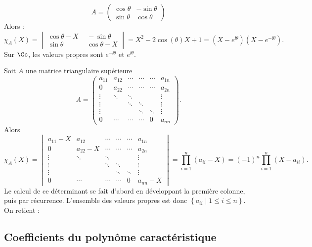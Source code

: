 \documentclass[11pt, class=report,crop=false]{standalone}
\begin{document}
\begin{exemple}
$$A = \begin{pmatrix}
\cos \theta & -\sin \theta\\
\sin \theta &\cos \theta
\end{pmatrix}$$
Alors :
\[\chi_A(X) 
= \begin{vmatrix}
\cos \theta -X \  & \ -\sin \theta\\
\sin \theta \  & \ \cos \theta-X
\end{vmatrix}
= X^2-2\cos(\theta) X +1 
= (X-e^{\ii\theta}) (X-e^{-\ii\theta}).\]
Sur $\Cc$, les valeurs propres sont $e^{-\ii\theta}$ et $e^{\ii\theta}$.
\end{exemple}


\begin{exemple}
Soit $A$ une matrice triangulaire supérieure
$$A = 
\begin{pmatrix}
a_{11} & a_{12} &\cdots&\cdots&\cdots & a_{1n}\\
0&a_{22}&\cdots&\cdots&\cdots&a_{2n}\\
\vdots&\ddots&\ddots&&&\vdots\\
\vdots&&\ddots&\ddots&&\vdots\\
\vdots & &&\ddots&\ddots&\vdots\\
0&\cdots&\cdots&\cdots&0&a_{nn}
\end{pmatrix}.
$$
Alors 
$$\chi_A(X)
= \begin{vmatrix}
a_{11}-X & a_{12} &\cdots&\cdots&\cdots & a_{1n}\\
0&a_{22}-X&\cdots&\cdots&\cdots&a_{2n}\\
\vdots&\ddots&\ddots&&&\vdots\\
\vdots&&\ddots&\ddots&&\vdots\\
\vdots & &&\ddots&\ddots&\vdots\\
0&\cdots&\cdots&\cdots&0&a_{nn}-X
\end{vmatrix}
= \prod_{i=1}^n(a_{ii}-X) =  (-1)^n \prod_{i=1}^n(X-a_{ii}).$$
Le calcul de ce déterminant se fait d'abord en développant la première colonne, puis par récurrence.
L'ensemble des valeurs propres est donc $\left\{a_{ii} \mid 1\le i \le n\right\}$.
On retient :
\end{exemple}



\subsection{Coefficients du polynôme caractéristique}
\end{document}
